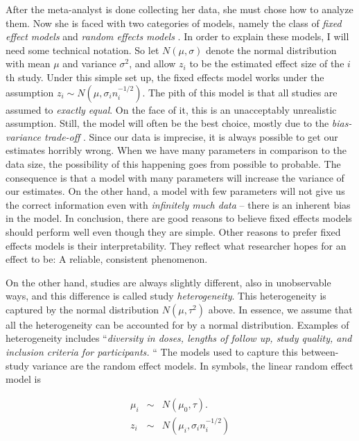 After the meta-analyst is done collecting her data, she must chose
how to analyze them. Now she is faced with two categories of models,
namely the class of \emph{fixed effect models} and \emph{random effects
models} \parencite[chapter 10]{Borenstein2011-yx}. In order
to explain these models, I will need some technical notation. So let
$N(\mu,\sigma)$ denote the normal distribution with mean $\mu$ and
variance $\sigma^{2}$, and allow $z_{i}$ to be the estimated effect
size of the $i$th study. Under this simple set up, the fixed effects
model works under the assumption $z_{i}\sim N(\mu,\sigma_{i}n_{i}^{-1/2})$.
The pith of this model is that all studies are assumed to \emph{exactly
equal}. On the face of it, this is an unacceptably unrealistic assumption.
Still, the model will often be the best choice, mostly due to the\emph{
bias-variance trade-off} \parencite[p. 37]{friedman_elements_2001}. Since
our data is imprecise, it is always possible to get our estimates
horribly wrong. When we have many parameters in comparison to the
data size, the possibility of this happening goes from possible to
probable. The consequence is that a model with many parameters will
increase the variance of our estimates. On the other hand, a model
with few parameters will not give us the correct information even
with \emph{infinitely much data} -- there is an inherent bias in
the model. In conclusion, there are good reasons to believe fixed
effects models should perform well even though they are simple. Other
reasons to prefer fixed effects models is their interpretability.
They reflect what researcher hopes for an effect to be: A reliable,
consistent phenomenon. 

On the other hand, studies are always slightly different, also in
unobservable ways, and this difference is called study \emph{heterogeneity}.
This heterogeneity is captured by the normal distribution $N\left(\mu,\tau^{2}\right)$
above. In essence, we assume that all the heterogeneity can be accounted
for by a normal distribution. Examples of heterogeneity includes ``\emph{diversity
in doses, lengths of follow up, study quality, and inclusion criteria
for participants.} \parencite{higgins_measuring_2003}`` The models used
to capture this between-study variance are the random effect models.
In symbols, the linear random effect model is

\begin{eqnarray}
\mu_{i} & \sim & N(\mu_{0},\tau).\label{eq:Random effects}\\
z_{i} & \sim & N(\mu_{i},\sigma_{i}n_{i}^{-1/2})\nonumber 
\end{eqnarray}

